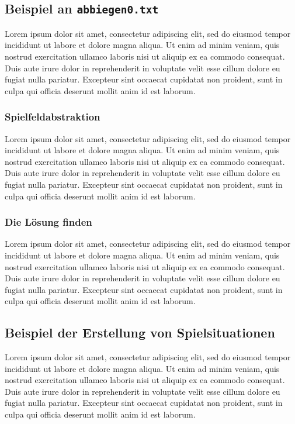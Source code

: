 \documentclass[a4paper,10pt,ngerman]{scrartcl}
\begin{document}
\subsection{Beispiel an \texttt{abbiegen0.txt}}
Lorem ipsum dolor sit amet, consectetur adipiscing elit, sed do eiusmod tempor incididunt ut labore et dolore magna aliqua.
Ut enim ad minim veniam, quis nostrud exercitation ullamco laboris nisi ut aliquip ex ea commodo consequat.
Duis aute irure dolor in reprehenderit in voluptate velit esse cillum dolore eu fugiat nulla pariatur.
Excepteur sint occaecat cupidatat non proident, sunt in culpa qui officia deserunt mollit anim id est laborum.

\subsubsection{Spielfeldabstraktion}
Lorem ipsum dolor sit amet, consectetur adipiscing elit, sed do eiusmod tempor incididunt ut labore et dolore magna aliqua.
Ut enim ad minim veniam, quis nostrud exercitation ullamco laboris nisi ut aliquip ex ea commodo consequat.
Duis aute irure dolor in reprehenderit in voluptate velit esse cillum dolore eu fugiat nulla pariatur.
Excepteur sint occaecat cupidatat non proident, sunt in culpa qui officia deserunt mollit anim id est laborum.

\subsubsection{Die Lösung finden}
Lorem ipsum dolor sit amet, consectetur adipiscing elit, sed do eiusmod tempor incididunt ut labore et dolore magna aliqua.
Ut enim ad minim veniam, quis nostrud exercitation ullamco laboris nisi ut aliquip ex ea commodo consequat.
Duis aute irure dolor in reprehenderit in voluptate velit esse cillum dolore eu fugiat nulla pariatur.
Excepteur sint occaecat cupidatat non proident, sunt in culpa qui officia deserunt mollit anim id est laborum.

\subsection{Beispiel der Erstellung von Spielsituationen}
Lorem ipsum dolor sit amet, consectetur adipiscing elit, sed do eiusmod tempor incididunt ut labore et dolore magna aliqua.
Ut enim ad minim veniam, quis nostrud exercitation ullamco laboris nisi ut aliquip ex ea commodo consequat.
Duis aute irure dolor in reprehenderit in voluptate velit esse cillum dolore eu fugiat nulla pariatur.
Excepteur sint occaecat cupidatat non proident, sunt in culpa qui officia deserunt mollit anim id est laborum.
\end{document}
